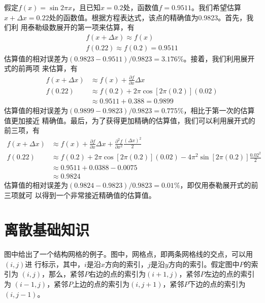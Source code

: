 假定$f(x)=\sin{2\pi x}$，且已知$x=0.2$处，函数值$f=0.9511$。我们希望估算
$x+\Delta x=0.22$处的函数值。根据方程表达式，该点的精确值为0.9823。首先，我们利
用泰勒级数展开的第一项来估算，有
\begin{equation}
  \begin{aligned}
    f(x+\Delta x) \approx f(x)  \\
    f(0.22) \approx f(0.2) = 0.9511
  \end{aligned} 
\end{equation}
估算值的相对误差为$(0.9823-0.9511)/0.9823=3.176\%$。接着，我们利用展开式的前两项
来估算，有
\begin{equation}
  \begin{aligned}
    f(x+\Delta x) &\approx f(x) + \frac{\partial f}{\partial x}\Delta x
  \\
    f(0.22) &\approx f(0.2) + 2\pi\cos{[2\pi(0.2)]}(0.02)
    \\
            &\approx 0.9511 + 0.388 = 0.9899
\end{aligned}
\end{equation}
估算值的相对误差为$(0.9899-0.9823)/0.9823=0.775\%$，相比于第一次的估算值更加接近
精确值。最后，为了获得更加精确的估算值，我们可以利用展开式的前三项，有
\begin{equation}
  \begin{aligned}
    f(x+\Delta x) &\approx f(x) + \frac{\partial f}{\partial x}\Delta x
    +
    \frac{\partial^{2} f}{\partial x^{2}}\frac{(\Delta x)^{2}}{2}
  \\
    f(0.22) &\approx f(0.2) + 2\pi\cos{[2\pi(0.2)]}(0.02) -
    4\pi^{2}\sin{[2\pi(0.2)]}\frac{0.02^{2}}{2}
    \\
            &\approx 0.9511 + 0.0388 - 0.0075
    \\
            &\approx 0.9824
\end{aligned}
\end{equation}
估算值的相对误差为$(0.9824-0.9823)/0.9823=0.01\%$，即仅用泰勒展开式的前三项就可
以得到一个非常接近精确值的估算值。

\section{离散基础知识}
图中给出了一个结构网格的例子。图中，网格点，即两条网格线的交点，可以用$(i,j)$进
行标示，其中，$i$是沿$x$方向的索引，$j$是沿$y$方向的索引。假定图中$P$的索引为
$(i,j)$，那么，紧邻$P$右边的点的索引为$(i+1,j)$，紧邻$P$左边的点的索引为
$(i-1,j)$，紧邻$P$上边的点的索引为$(i,j+1)$，紧邻$P$下边的点的索引为$(i,j-1)$。

